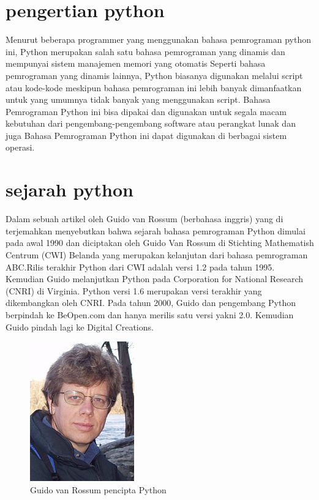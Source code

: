
\section{pengertian python}
     
      Menurut beberapa  programmer yang menggunakan bahasa pemrograman python ini, Python merupakan salah satu bahasa pemrograman 
      yang dinamis dan mempunyai sistem manajemen memori yang otomatis Seperti bahasa pemrograman yang dinamis lainnya, Python 
      biasanya digunakan melalui script atau kode-kode meskipun bahasa pemrograman ini lebih banyak dimanfaatkan untuk yang umumnya
      tidak banyak yang menggunakan script. Bahasa Pemrograman Python ini bisa dipakai dan digunakan untuk segala macam kebutuhan 
      dari pengembang-pengembang software atau perangkat lunak dan juga Bahasa Pemrograman Python ini dapat digunakan di berbagai 
      sistem operasi.
      
\section {sejarah python}
 
      Dalam sebuah artikel oleh Guido van Rossum (berbahasa inggris) yang di terjemahkan menyebutkan bahwa sejarah bahasa pemrograman 
      Python dimulai pada awal 1990 dan diciptakan oleh Guido Van Rossum di Stichting Mathematish Centrum (CWI) Belanda yang merupakan 
      kelanjutan dari bahasa pemrograman ABC.Rilis terakhir Python dari CWI adalah versi 1.2 pada tahun 1995. Kemudian Guido melanjutkan 
      Python pada Corporation for National Research (CNRI) di Virginia. Python versi 1.6 merupakan versi terakhir yang dikembangkan oleh 
      CNRI. Pada tahun 2000, Guido dan pengembang Python berpindah ke BeOpen.com dan hanya merilis satu versi yakni 2.0. Kemudian 
      Guido pindah lagi ke Digital Creations.

	\begin{figure}[ht]
	\centerline{\includegraphics[width=.5\textwidth]{figures/Guido.png}}
	\caption{Guido van Rossum pencipta Python}
	\label{Guido}
	\end{figure}
      
